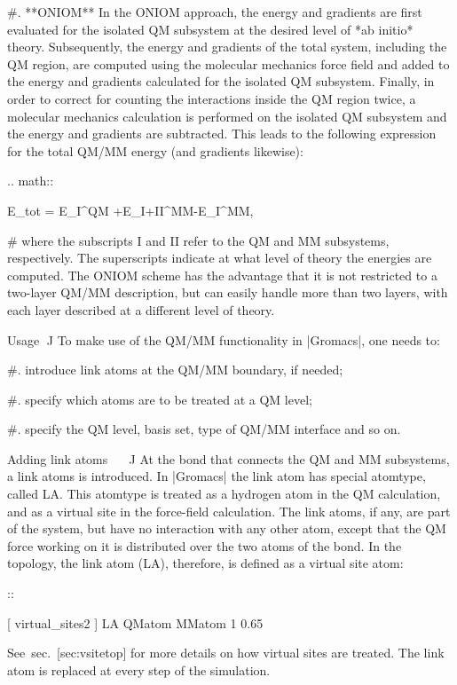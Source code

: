 #. **ONIOM** In the ONIOM approach, the energy and gradients are first
   evaluated for the isolated QM subsystem at the desired level of *ab
   initio* theory. Subsequently, the energy and gradients of the total
   system, including the QM region, are computed using the molecular
   mechanics force field and added to the energy and gradients
   calculated for the isolated QM subsystem. Finally, in order to
   correct for counting the interactions inside the QM region twice, a
   molecular mechanics calculation is performed on the isolated QM
   subsystem and the energy and gradients are subtracted. This leads to
   the following expression for the total QM/MM energy (and gradients
   likewise):

   .. math::

      E_{tot} = E_{I}^{QM}
      +E_{I+II}^{MM}-E_{I}^{MM},

#  where the subscripts I and II refer to the QM and MM subsystems,
   respectively. The superscripts indicate at what level of theory the
   energies are computed. The ONIOM scheme has the advantage that it is
   not restricted to a two-layer QM/MM description, but can easily
   handle more than two layers, with each layer described at a different
   level of theory.

Usage
^^^^^

To make use of the QM/MM functionality in |Gromacs|, one needs to:

#. introduce link atoms at the QM/MM boundary, if needed;

#. specify which atoms are to be treated at a QM level;

#. specify the QM level, basis set, type of QM/MM interface and so on.

Adding link atoms
^^^^^^^^^^^^^^^^^

At the bond that connects the QM and MM subsystems, a link atoms is
introduced. In |Gromacs| the link atom has special atomtype, called LA.
This atomtype is treated as a hydrogen atom in the QM calculation, and
as a virtual site in the force-field calculation. The link atoms, if
any, are part of the system, but have no interaction with any other
atom, except that the QM force working on it is distributed over the two
atoms of the bond. In the topology, the link atom (LA), therefore, is
defined as a virtual site atom:

::

    [ virtual_sites2 ]
    LA QMatom MMatom 1 0.65

See sec. [sec:vsitetop] for more details on how virtual sites are
treated. The link atom is replaced at every step of the simulation.


